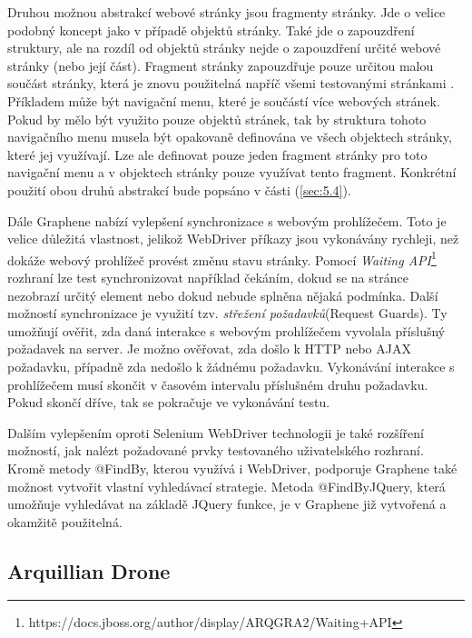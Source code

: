 \documentclass[
    color,   %
	table,   %
    twoside, %
    nolot, nolof
]{fithesis3}
\begin{document}
Druhou možnou abstrakcí webové stránky jsou fragmenty stránky. Jde o velice podobný koncept jako v případě objektů stránky. Také jde o zapouzdření struktury, ale na rozdíl od objektů stránky nejde o zapouzdření určité webové stránky (nebo její část). Fragment stránky zapouzdřuje pouze určitou malou součást stránky, která je znovu použitelná napříč všemi testovanými stránkami \cite{Graphene}. Příkladem může být navigační menu, které je součástí více webových stránek. Pokud by mělo být využito pouze objektů stránek, tak by struktura tohoto navigačního menu musela být opakovaně definována ve všech objektech stránky, které jej využívají. Lze ale definovat pouze jeden fragment stránky pro toto navigační menu a v objektech stránky pouze využívat tento fragment. Konkrétní použití obou druhů abstrakcí bude popsáno v části (\ref{sec:5.4}).

Dále Graphene nabízí vylepšení synchronizace s webovým prohlížečem. Toto je velice důležitá vlastnost, jelikož WebDriver příkazy jsou vykonávány rychleji, než dokáže webový prohlížeč provést změnu stavu stránky. Pomocí \emph{Waiting API}\footnote{https://docs.jboss.org/author/display/ARQGRA2/Waiting+API} rozhraní lze test synchronizovat například čekáním, dokud se na stránce nezobrazí určitý element nebo dokud nebude splněna nějaká podmínka. Další možností synchronizace je využití tzv. \emph{střežení požadavků}(Request Guards). Ty umožňují ověřit, zda daná interakce s webovým prohlížečem vyvolala příslušný požadavek na server. Je možno ověřovat, zda došlo k HTTP nebo AJAX požadavku, případně zda nedošlo k žádnému požadavku. Vykonávání interakce s prohlížečem musí skončit v časovém intervalu příslušném druhu požadavku. Pokud skončí dříve, tak se pokračuje ve vykonávání testu.

Dalším vylepšením oproti Selenium WebDriver technologii je také rozšíření možností, jak nalézt požadované prvky testovaného uživatelského rozhraní. Kromě metody @FindBy, kterou využívá i WebDriver, podporuje Graphene také možnost vytvořit vlastní vyhledávací strategie. Metoda @FindByJQuery, která umožňuje vyhledávat na základě JQuery funkce, je v Graphene již vytvořená a okamžitě použitelná.

\subsection{Arquillian Drone}
\end{document}

